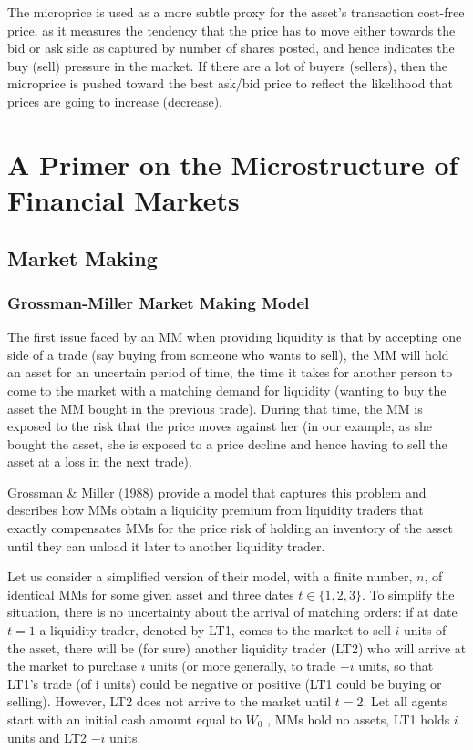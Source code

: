 \documentclass[11pt]{article}
\begin{document}
The microprice is used as a more subtle proxy for the asset's transaction cost-free price, as it
measures the tendency that the price has to move either towards the bid or ask side as captured by
number of shares posted, and hence indicates the buy (sell) pressure in the market. If there are a lot
of buyers (sellers), then the microprice is pushed toward the best ask/bid price to reflect the
likelihood that prices are going to increase (decrease).
\section{A Primer on the Microstructure of Financial Markets}
\label{sec:orged730a1}
\subsection{Market Making}
\label{sec:org140be4d}
\subsubsection{Grossman-Miller Market Making Model}
\label{sec:org70bf4b9}
The first issue faced by an MM when providing liquidity is that by accepting one side of a trade (say
buying from someone who wants to sell), the MM will hold an asset for an uncertain period of time, the
time it takes for another person to come to the market with a matching demand for liquidity (wanting
to buy the asset the MM bought in the previous trade). During that time, the MM is exposed to the risk
that the price moves against her (in our example, as she bought the asset, she is exposed to a price
decline and hence having to sell the asset at a loss in the next trade).

Grossman \& Miller (1988) provide a model that captures this problem and describes how MMs obtain a
liquidity premium from liquidity traders that exactly compensates MMs for the price risk of holding an
inventory of the asset until they can unload it later to another liquidity trader.

Let us consider a simplified version of their model, with a finite number, \(n\), of identical MMs for
some given asset and three dates \(t\in\{1,2,3\}\). To simplify the situation, there is no uncertainty
about the arrival of matching orders: if at date \(t=1\) a liquidity trader, denoted by LT1, comes to
the market to sell \(i\) units of the asset, there will be (for sure) another liquidity trader (LT2)
who will arrive at the market to purchase \(i\) units (or more generally, to trade \(-i\) units, so
that LT1's trade (of i units) could be negative or positive (LT1 could be buying or selling). However,
LT2 does not arrive to the market until \(t=2\). Let all agents start with an initial cash amount
equal to \(W_0\) , MMs hold no assets, LT1 holds \(i\) units and LT2 \(-i\) units.
\end{document}
